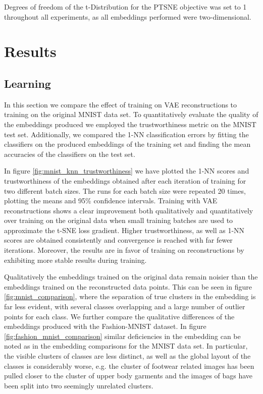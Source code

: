 Degrees of freedom of the t-Distribution for the PTSNE objective was set to 1 throughout all experiments, as all embeddings performed were two-dimensional.

\section{Results}
\label{section:results}

\subsection{Learning}
\label{subsection:learning}

In this section we compare the effect of training on VAE reconstructions to training on the original MNIST data set. To quantitatively evaluate the quality of the embeddings produced we employed the trustworthiness metric \cite{trustworthiness} on the MNIST test set. Additionally, we compared the 1-NN classification errors by fitting the classifiers on the produced embeddings of the training set and finding the mean accuracies of the classifiers on the test set.

In figure \ref{fig:mnist_knn_trustworthiness} we have plotted the 1-NN scores and trustworthiness of the embeddings obtained after each iteration of training for two different batch sizes. The runs for each batch size were repeated 20 times, plotting the means and 95\% confidence intervals. Training with VAE reconstructions shows a clear improvement both qualitatively and quantitatively over training on the original data when small training batches are used to approximate the t-SNE loss gradient. Higher trustworthiness, as well as 1-NN scores are obtained consistently and convergence is reached with far fewer iterations. Moreover, the results are in favor of training on reconstructions by exhibiting more stable results during training.

Qualitatively the embeddings trained on the original data remain noisier than the embeddings trained on the reconstructed data points. This can be seen in figure \ref{fig:mnist_comparison}, where the separation of true clusters in the embedding is far less evident, with several classes overlapping and a large number of outlier points for each class. We further compare the qualitative differences of the embeddings produced with the Fashion-MNIST dataset. In figure \ref{fig:fashion_mnist_comparison} similar deficiencies in the embedding can be noted as in the embedding comparisons for the MNIST data set. In particular, the visible clusters of classes are less distinct, as well as the global layout of the classes is considerably worse, e.g. the cluster of footwear related images has been pulled closer to the cluster of upper body garments and the images of bags have been split into two seemingly unrelated clusters.


